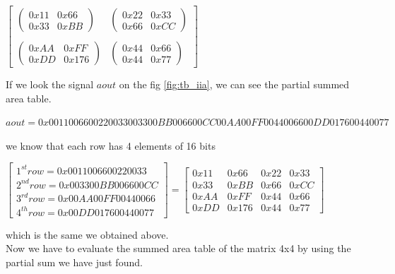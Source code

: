       \begin{center} \label{iia_matrix}
      	$ \begin{bmatrix}
      	\begin{pmatrix}
      	0x11 &0x66\\
      	0x33& 0xBB
      	\end{pmatrix}&
      	\begin{pmatrix}
      	0x22 & 0x33\\
      	0x66& 0xCC 
      	\end{pmatrix}\\
      	&\\
      	\begin{pmatrix}
      	0xAA&0xFF\\
      	0xDD&0x176
      	\end{pmatrix}&
      	\begin{pmatrix}
      	0x44  &0x66\\
      	0x44 &0x77
      	\end{pmatrix}
      	\end{bmatrix} $
      \end{center}
      \bigskip
      If we look the signal $ aout $ on the fig \ref{fig:tb_iia}, we can see the partial summed area table.
      \begin{center}
      	$ aout=0x0011006600220033003300BB006600CC00AA00FF0044006600DD017600440077 $
      \end{center}
      we know that each row has 4 elements of 16 bits
      \begin{center}
      	$ \begin{bmatrix}
      	1^{st}row=0x0011006600220033\\
      	2^{nd}row=0x003300BB006600CC\\
      	3^{rd}row=0x00AA00FF00440066\\
      	4^{th}row=0x00DD017600440077
      	\end{bmatrix} =\begin{bmatrix}
      	0x11 &0x66 & 0x22 & 0x33\\
      	0x33 & 0xBB &0x66&0xCC\\
      	0xAA&0xFF&0x44&0x66\\
      	0xDD&0x176&0x44&0x77
      	\end{bmatrix}$
      \end{center}
      which is the same we obtained above.\\
      Now we have to evaluate the summed area table of the matrix 4x4 by using the partial sum we have just found.

